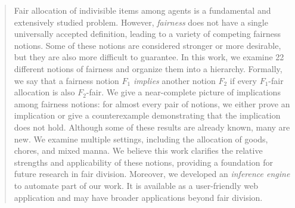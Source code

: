 \begin{abstract}
Fair allocation of indivisible items among agents is a fundamental and extensively studied problem. However, \emph{fairness} does not have a single universally accepted definition, leading to a variety of competing fairness notions. Some of these notions are considered stronger or more desirable, but they are also more difficult to guarantee.
%
In this work, we examine 22 different notions of fairness and organize them into a hierarchy. Formally, we say that a fairness notion $F_1$ \emph{implies} another notion $F_2$ if every $F_1$-fair allocation is also $F_2$-fair. We give a near-complete picture of implications among fairness notions: for almost every pair of notions, we either prove an implication or give a counterexample demonstrating that the implication does not hold. Although some of these results are already known, many are new.
%
We examine multiple settings, including the allocation of goods, chores, and mixed manna. We believe this work clarifies the relative strengths and applicability of these notions, providing a foundation for future research in fair division.
%
Moreover, we developed an \emph{inference engine} to automate part of our work. It is available as a user-friendly web application and may have broader applications beyond fair division.
\end{abstract}
